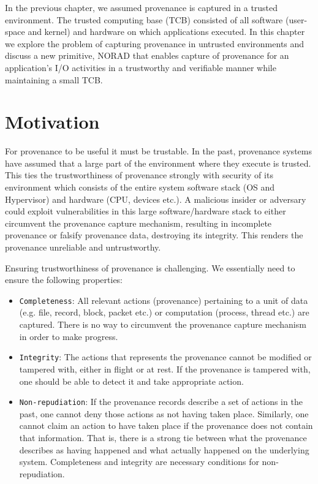 \documentclass[withindex,glossary]{cam-thesis}
\begin{document}
In the previous chapter, we assumed provenance is captured in a trusted environment.
The trusted computing base (TCB) consisted of all software (user-space and kernel) and hardware on which applications executed.
In this chapter we explore the problem of capturing provenance in untrusted environments and discuss a new primitive, NORAD that enables capture of provenance for an application's I/O activities in a trustworthy and verifiable manner while maintaining a small TCB.

\section{Motivation}

For provenance to be useful it must be trustable.
In the past, provenance systems have assumed that a large part of the environment where they execute is trusted.
This ties the trustworthiness of provenance strongly with security of its environment which consists of the entire system software stack (OS and Hypervisor) and hardware (CPU, devices etc.).
A malicious insider or adversary could exploit vulnerabilities in this large software/hardware stack to either circumvent the provenance capture mechanism, resulting in incomplete provenance or falsify provenance data, destroying its integrity.
This renders the provenance unreliable and untrustworthy.

Ensuring trustworthiness of provenance is challenging.
We essentially need to ensure the following properties:
\begin{itemize}

\item \texttt{Completeness}: All relevant actions (provenance) pertaining to a unit of data (e.g. file, record, block, packet etc.) or computation (process, thread etc.) are captured.
There is no way to circumvent the provenance capture mechanism in order to make progress.

\item \texttt{Integrity}: The actions that represents the provenance cannot be modified or tampered with, either in flight or at rest. If the provenance is tampered with, one should be able to detect it and take appropriate action.

\item \texttt{Non-repudiation}: If the provenance records describe a set of actions in the past, one cannot deny those actions as not having taken place. Similarly, one cannot claim an action to have taken place if the provenance does not contain that information. That is, there is a strong tie between what the provenance describes as having happened and what actually happened on the underlying system. Completeness and integrity are necessary conditions for non-repudiation.

\end{itemize}
\end{document}
